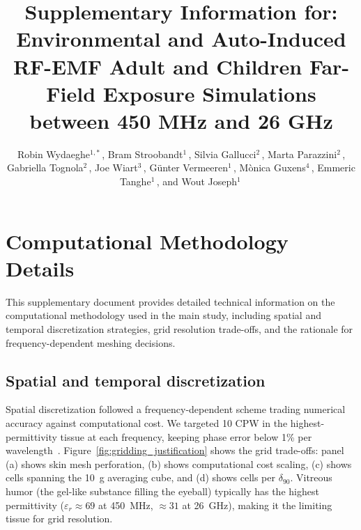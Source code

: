 \documentclass{iopjournal}
\begin{document}
\linenumbers

\title{Supplementary Information for: Environmental and Auto-Induced RF-EMF Adult and Children Far-Field Exposure Simulations between 450 MHz and 26 GHz}
\author{Robin Wydaeghe$^{1,*}$\,, Bram Stroobandt$^1$\,, Silvia Gallucci$^2$\,, Marta Parazzini$^2$\,, Gabriella Tognola$^2$\,, Joe Wiart$^3$\,, Günter Vermeeren$^1$\,, Mònica Guxens$^4$\,, Emmeric Tanghe$^1$\,, and Wout Joseph$^{1}$\,}








\section{Computational Methodology Details}

This supplementary document provides detailed technical information on the computational methodology used in the main study, including spatial and temporal discretization strategies, grid resolution trade-offs, and the rationale for frequency-dependent meshing decisions.

\subsection{Spatial and temporal discretization}
\label{si:discretization}

Spatial discretization followed a frequency-dependent scheme trading numerical accuracy against computational cost.
We targeted 10 \gls{CPW} in the highest-permittivity tissue at each frequency, keeping phase error below 1\% per wavelength~\citep{taflove2005computational}.
Figure~\ref{fig:gridding_justification} shows the grid trade-offs: panel (a) shows skin mesh perforation, (b) shows computational cost scaling, (c) shows cells spanning the 10~g averaging cube, and (d) shows cells per $\delta_{90}$.
Vitreous humor (the gel-like substance filling the eyeball) typically has the highest permittivity ($\varepsilon_r \approx 69$ at 450~MHz, $\approx 31$ at 26~GHz), making it the limiting tissue for grid resolution.
\end{document}
